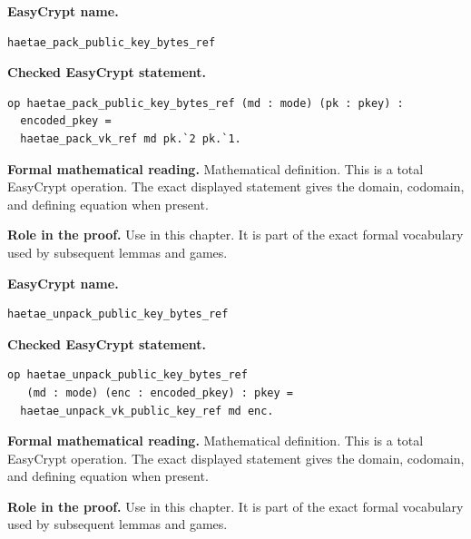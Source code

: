\begin{formaldefinition}
\noindent\textbf{EasyCrypt name.}
\begin{lstlisting}[language=EasyCrypt,basicstyle=\ttfamily\scriptsize]
haetae_pack_public_key_bytes_ref
\end{lstlisting}
\noindent\textbf{Checked EasyCrypt statement.}
\begin{lstlisting}[language=EasyCrypt,basicstyle=\ttfamily\scriptsize]
op haetae_pack_public_key_bytes_ref (md : mode) (pk : pkey) :
  encoded_pkey =
  haetae_pack_vk_ref md pk.`2 pk.`1.
\end{lstlisting}
\noindent\textbf{Formal mathematical reading.}
Mathematical definition. This is a total EasyCrypt operation.  The exact displayed statement gives the domain, codomain, and defining equation when present.

\noindent\textbf{Role in the proof.}
Use in this chapter. It is part of the exact formal vocabulary used by subsequent lemmas and games.

\end{formaldefinition}

\begin{formaldefinition}
\noindent\textbf{EasyCrypt name.}
\begin{lstlisting}[language=EasyCrypt,basicstyle=\ttfamily\scriptsize]
haetae_unpack_public_key_bytes_ref
\end{lstlisting}
\noindent\textbf{Checked EasyCrypt statement.}
\begin{lstlisting}[language=EasyCrypt,basicstyle=\ttfamily\scriptsize]
op haetae_unpack_public_key_bytes_ref
   (md : mode) (enc : encoded_pkey) : pkey =
  haetae_unpack_vk_public_key_ref md enc.
\end{lstlisting}
\noindent\textbf{Formal mathematical reading.}
Mathematical definition. This is a total EasyCrypt operation.  The exact displayed statement gives the domain, codomain, and defining equation when present.

\noindent\textbf{Role in the proof.}
Use in this chapter. It is part of the exact formal vocabulary used by subsequent lemmas and games.

\end{formaldefinition}

